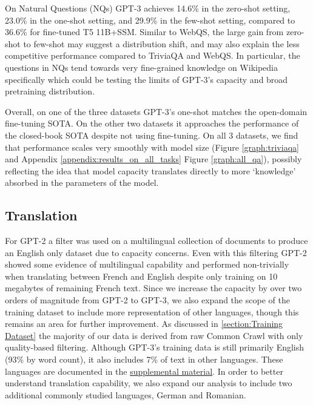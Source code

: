 \documentclass{article}
\begin{document}
On Natural Questions (NQs) GPT-3 achieves 14.6\% in the zero-shot setting, 23.0\% in the one-shot setting, and 29.9\% in the few-shot setting, compared to 36.6\% for fine-tuned T5 11B+SSM.  Similar to WebQS, the large gain from zero-shot to few-shot may suggest a distribution shift, and may also explain the less competitive performance compared to TriviaQA and WebQS.  In particular, the questions in NQs tend towards very fine-grained knowledge on Wikipedia specifically which could be testing the limits of GPT-3's capacity and broad pretraining distribution.

Overall, on one of the three datasets GPT-3's one-shot matches the open-domain fine-tuning SOTA. On the other two datasets it approaches the performance of the closed-book SOTA despite not using fine-tuning.  On all 3 datasets, we find that performance scales very smoothly with model size (Figure \ref{graph:triviaqa} and Appendix \ref{appendix:results_on_all_tasks} Figure \ref{graph:all_qa}), possibly reflecting the idea that model capacity translates directly to more ‘knowledge’ absorbed in the parameters of the model.



     
    \subsection{Translation}
    \label{section:Translation}
    

For GPT-2 a filter was used on a multilingual collection of documents to produce an English only dataset due to capacity concerns. Even with this filtering GPT-2 showed some evidence of multilingual capability and performed non-trivially when translating between French and English despite only training on 10 megabytes of remaining French text. Since we increase the capacity by over two orders of magnitude from GPT-2 to GPT-3, we also expand the scope of the training dataset to include more representation of other languages, though this remains an area for further improvement. As discussed in \ref{section:Training Dataset} the majority of our data is derived from raw Common Crawl with only quality-based filtering. Although GPT-3's training data is still primarily English (93\% by word count), it also includes 7\% of text in other languages. These languages are documented in the \href{https://github.com/openai/gpt-3}{supplemental material}. In order to better understand translation capability, we also expand our analysis to include two additional commonly studied languages, German and Romanian.
\end{document}
